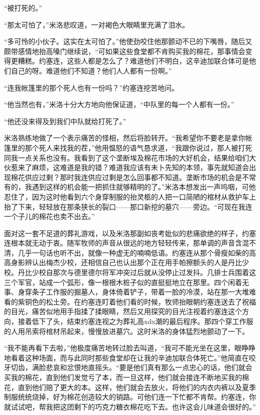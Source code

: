     “被打死的。”

    “那太可怕了，”米洛悲叹道，一对褐色大眼睛里充满了泪水。

    “多可怜的小伙子。这实在太可怕了。”他使劲咬住他那颤动不已的下嘴唇，随后又颇带感情地抬高嗓门继续说，“可如果这些食堂都不肯购买我的棉花，那事情会变得更糟糕。约塞连，这些人都是怎么了？难道他们不明白，这辛迪加联合体可是他们自己的呀。难道他们不知道？他们人人都有一份啊。”

    “连我帐篷里的那个死人也有一份吗？”约塞连挖苦地问。

    “他当然也有，”米洛十分大方地向他保证道，“中队里的每一个人都有一份。”

    “他还没来得及到我们中队就给打死了。”

    米洛熟练地做了一个表示痛苦的怪相，然后将脸转开。“我希望你不要老是拿你帐篷里的那个死人来找我的茬，”他用愠怒的语气恳求道，“我跟你说过，那人被打死同我一点关系也没有。我看到了这个垄断埃及棉花市场的大好机会，结果给咱们大伙惹来了麻烦，这难道是我的错？难道我应该有未卜先知的本领，事先就知道会出现棉花供应过剩？那时我连供应过剩是怎么回事都不知道。垄断市场的机会是不常有的，我遇到这样的机会能一把抓住就够精明的了。”米洛本想发出一声呜咽，可他忍住了，因为这时他看到六个身穿制服的抬灵柩的人把一口简陋的棺材从救护车上抬了下来，轻轻放在那条狭长的裂口——那口新挖的墓穴——旁边。“可现在我连一个子儿的棉花也卖不出去。”

    面对这一套不足道的葬礼游戏，以及米洛那副如丧考妣似的悲痛欲绝的样子，约塞连根本就无动于衷。随军牧师的声音从很远的地方轻轻传来，那单调的声音含混不清，几乎一句话也听不出，就像一种虚无的喃喃低语。约塞连从那个骨瘦如柴的高高身影辨认出梅杰少校，还相信自己也认出那个正在用手帕擦额头的人是丹比少校。丹比少校自那次与德里德尔将军冲突过后就从没停止过发抖。几排士兵围着这三个军官，站成一个弧形，像一根根木桩子似的直挺挺地立在那里。四个闲着无事、身穿条子工作服的掘墓人，身体倚着铲子，带着一脸的冷漠，站在那一大堆难看的紫铜色的松土旁。在约塞连盯着他们看的时候，牧师抬眼朝约塞连送去了祝福的目光，痛苦似地用手指揉了揉眼睛，然后又用探究的目光注视着约塞连这个方向，接着低下了头，结束约塞连视之为葬礼高xdx潮的最后程序。那四个穿工作服的人用吊索将棺材吊起来，慢慢放进墓穴。这时米洛的身体猛烈地颤动了一下。

    “我不能再看下去啦，”他极度痛苦地转过脸去叫道，“我可不能光坐在这里，眼睁睁地看着这种场面，而与此同时那些食堂却在让我的辛迪加联合体死亡。”他简直在咬牙切齿，满脸悲哀和忿恨地直摇头。“要是他们真有那么一点忠心的话，他们就会买我的棉花，直到他们发觉亏了本，而一旦这样，他们就会接连不断地买我的棉花，直到他们赔了更大的本。这样，他们就会去放火，将他们的内衣内裤以及夏季制服统统烧掉，好为棉花创造较大的销路。可他们连一下忙都不肯帮。约塞连，你就试试吧，帮我把这团剩下的巧克力糖衣棉花吃下去。也许这会儿味道会很好的。”

